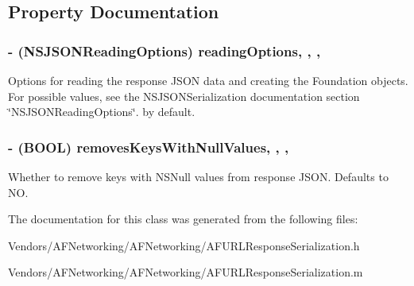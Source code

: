 \subsection{Property Documentation}
\hypertarget{interface_a_f_j_s_o_n_response_serializer_a344e139d77d63a22446f3c95990d2bce}{}
\subsubsection[{reading\+Options}]{\setlength{\rightskip}{0pt plus 5cm}-\/ (N\+S\+J\+S\+O\+N\+Reading\+Options) reading\+Options\hspace{0.3cm}{\ttfamily [read]}, {\ttfamily [write]}, {\ttfamily [nonatomic]}, {\ttfamily [assign]}}\label{interface_a_f_j_s_o_n_response_serializer_a344e139d77d63a22446f3c95990d2bce}
Options for reading the response J\+S\+O\+N data and creating the Foundation objects. For possible values, see the {\ttfamily N\+S\+J\+S\+O\+N\+Serialization} documentation section \char`\"{}\+N\+S\+J\+S\+O\+N\+Reading\+Options\char`\"{}. {} by default. \hypertarget{interface_a_f_j_s_o_n_response_serializer_af7be2fbd6e630440952f10bf448569aa}{}
\subsubsection[{removes\+Keys\+With\+Null\+Values}]{\setlength{\rightskip}{0pt plus 5cm}-\/ (B\+O\+O\+L) removes\+Keys\+With\+Null\+Values\hspace{0.3cm}{\ttfamily [read]}, {\ttfamily [write]}, {\ttfamily [nonatomic]}, {\ttfamily [assign]}}\label{interface_a_f_j_s_o_n_response_serializer_af7be2fbd6e630440952f10bf448569aa}
Whether to remove keys with {\ttfamily N\+S\+Null} values from response J\+S\+O\+N. Defaults to {\ttfamily N\+O}. 

The documentation for this class was generated from the following files\+:\begin{DoxyCompactItemize}
\item 
Vendors/\+A\+F\+Networking/\+A\+F\+Networking/A\+F\+U\+R\+L\+Response\+Serialization.\+h\item 
Vendors/\+A\+F\+Networking/\+A\+F\+Networking/A\+F\+U\+R\+L\+Response\+Serialization.\+m\end{DoxyCompactItemize}
